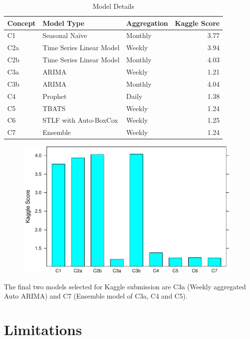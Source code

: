 \documentclass[floatsintext,man]{apa6}
\theoremstyle{definition}
\theoremstyle{definition}
\theoremstyle{definition}
\theoremstyle{remark}
\begin{document}
\begin{table}[H]

\caption{\label{tab:unnamed-chunk-7}Model Details}
\centering
\begin{tabular}[t]{lllr}
\toprule
Concept & Model Type & Aggregation & Kaggle Score\\
\midrule
C1 & Seasonal Naïve & Monthly & 3.77\\
C2a & Time Series Linear Model & Weekly & 3.94\\
C2b & Time Series Linear Model & Monthly & 4.03\\
C3a & ARIMA & Weekly & 1.21\\
C3b & ARIMA & Monthly & 4.04\\
\addlinespace
C4 & Prophet & Daily & 1.38\\
C5 & TBATS & Weekly & 1.24\\
C6 & STLF with Auto-BoxCox & Weekly & 1.25\\
C7 & Ensemble & Weekly & 1.24\\
\bottomrule
\end{tabular}
\end{table}

\begin{figure}
\centering
\includegraphics{Final_report_files/figure-latex/unnamed-chunk-8-1.pdf}
\caption{}
\end{figure}

The final two models selected for Kaggle submission are C3a (Weekly
aggregated Auto ARIMA) and C7 (Ensemble model of C3a, C4 and C5).

\section{Limitations}\label{limitations}
\end{document}
